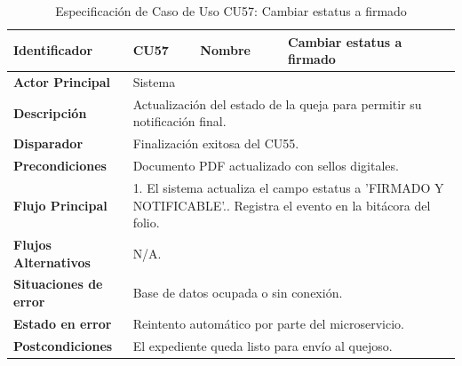 \begingroup
\setlength{\parskip}{0pt}
\begin{longtable}{|p{3.5cm}|p{2cm}|p{2.5cm}|p{7cm}|}
\caption{Especificación de Caso de Uso CU57: Cambiar estatus a firmado}
\label{tab:cu57} \\
\hline
\textbf{Identificador} & CU57 & \textbf{Nombre} & Cambiar estatus a firmado \\ \hline
\textbf{Actor Principal} & \multicolumn{3}{p{11.5cm}|}{Sistema} \\ \hline
\textbf{Descripción} & \multicolumn{3}{p{11.5cm}|}{Actualización del estado de la queja para permitir su notificación final.} \\ \hline
\textbf{Disparador} & \multicolumn{3}{p{11.5cm}|}{Finalización exitosa del CU55.} \\ \hline
\textbf{Precondiciones} & \multicolumn{3}{p{11.5cm}|}{Documento PDF actualizado con sellos digitales.} \\ \hline
\textbf{Flujo Principal} & \multicolumn{3}{p{11.5cm}|}{1. El sistema actualiza el campo estatus a 'FIRMADO Y NOTIFICABLE'.\newline 2. Registra el evento en la bitácora del folio.} \\ \hline
\textbf{Flujos Alternativos} & \multicolumn{3}{p{11.5cm}|}{N/A.} \\ \hline
\textbf{Situaciones de error} & \multicolumn{3}{p{11.5cm}|}{Base de datos ocupada o sin conexión.} \\ \hline
\textbf{Estado en error} & \multicolumn{3}{p{11.5cm}|}{Reintento automático por parte del microservicio.} \\ \hline
\textbf{Postcondiciones} & \multicolumn{3}{p{11.5cm}|}{El expediente queda listo para envío al quejoso.} \\ \hline
\end{longtable}
\endgroup

\vspace{0.8cm}


